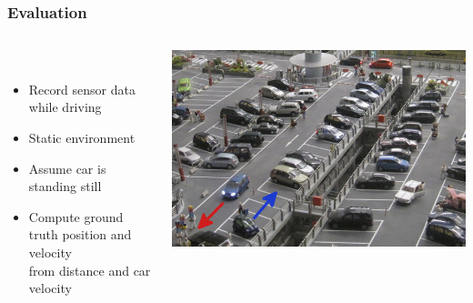 \begin{frame}
  \frametitle{Evaluation}
  \begin{columns}
  \begin{column}{0.6\textwidth}
  \begin{description}[]
  \item[Relative Reference Frame Approach] \hfill \\
  \begin{itemize}
  \item Record sensor data while driving
  \item Static environment
  \item Assume car is standing still
  \pause
  \item Compute ground truth position and velocity\\ from distance and car velocity
  \end{itemize}
  \end{description}
  \end{column}
  \begin{column}{0.4\textwidth}
  \includegraphics[width=\textwidth]{images/parking}\\
\end{column}
\end{columns}
\end{frame}
